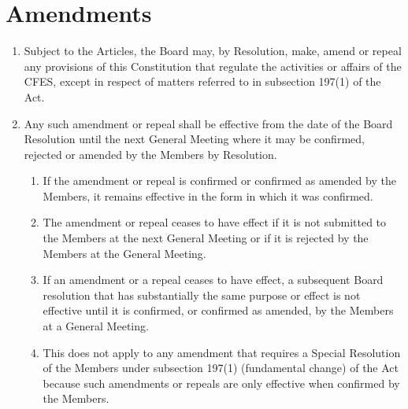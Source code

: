 \section{Amendments}
\label{amendments}

\begin{enumerate}
 \item Subject to the Articles, the Board may, by Resolution, make, amend or repeal any provisions of this Constitution that regulate the activities or affairs of the CFES, except in respect of matters referred to in subsection 197(1) of the Act.
 \item Any such amendment or repeal shall be effective from the date of the Board Resolution until the next General Meeting where it may be confirmed, rejected or amended by the Members by Resolution.
  \begin{enumerate}
   \item If the amendment or repeal is confirmed or confirmed as amended by the Members, it remains effective in the form in which it was confirmed.
   \item The amendment or repeal ceases to have effect if it is not submitted to the Members at the next General Meeting or if it is rejected by the Members at the General Meeting.
   \item If an amendment or a repeal ceases to have effect, a subsequent Board resolution that has substantially the same purpose or effect is not effective until it is confirmed, or confirmed as amended, by the Members at a General Meeting.
   \item This does not apply to any amendment that requires a Special Resolution of the Members under subsection 197(1) (fundamental change) of the Act because such amendments or repeals are only effective when confirmed by the Members.
  \end{enumerate}
\end{enumerate}
